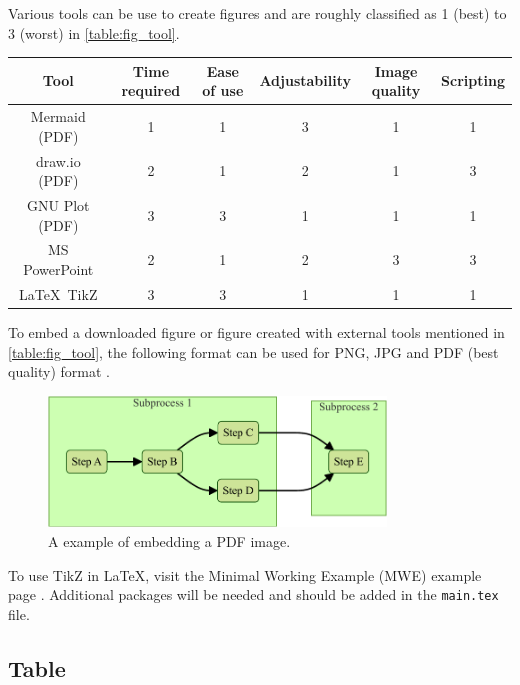 Various tools can be use to create figures and are roughly classified as 1 (best) to 3 (worst) in \autoref{table:fig_tool}.

\begin{center}
    \label{table:fig_tool}
    \begin{tabular}{ c c c c c c }
        \toprule
        Tool & Time required & Ease of use & Adjustability & Image quality & Scripting \\
        \midrule
        Mermaid (PDF) \cite{mermaid} & 1 & 1 & 3 & 1 & 1 \\
        draw.io (PDF) \cite{drawio} & 2 & 1 & 2 & 1 & 3 \\
        GNU Plot (PDF) \cite{gnuplot} & 3 & 3 & 1 & 1 & 1 \\
        MS PowerPoint & 2 & 1 & 2 & 3 & 3 \\
        \LaTeX\ TikZ \cite{tikz} & 3 & 3 & 1 & 1 & 1 \\
        \bottomrule
    \end{tabular}
\end{center}

To embed a downloaded figure or figure created with external tools mentioned in \autoref{table:fig_tool}, the following format can be used for PNG, JPG and PDF (best quality) format \cite{inserting_img}.

\begin{figure}[H]
    \centering
    \includegraphics[width=0.8\textwidth]{../figure/mermaid_out/flowchart.pdf}
    \caption{A example of embedding a PDF image.}
    \label{fig:embed_pdf}
\end{figure}

To use TikZ in \LaTeX, visit the Minimal Working Example (MWE) example page \cite{tikz_example}. Additional packages will be needed and should be added in the \texttt{main.tex} file.

\subsection{Table}
